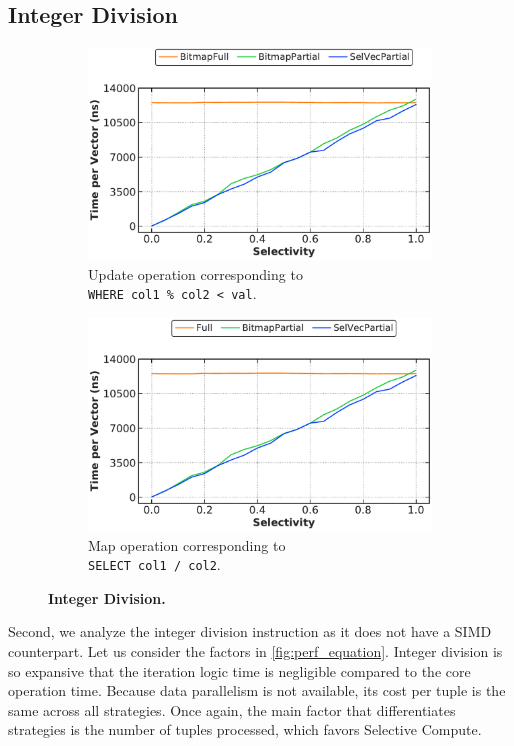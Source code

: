 \documentclass[12pt]{cmuthesis}
\begin{document}
\subsection{Integer Division}
\begin{figure}[t!]
\captionsetup[subfigure]{justification=justified}
\centering
\begin{subfigure}[t]{.49\linewidth}
 \centering
 \includegraphics[width=0.9\linewidth]{eval/simple_division_update.pdf}
 \caption{Update operation corresponding to \\ \texttt{\footnotesize WHERE col1 \% col2 < val}.}
  \label{fig:division_update}
\end{subfigure}
\begin{subfigure}[t]{.49\linewidth}
 \centering
 \includegraphics[width=0.9\linewidth]{eval/simple_division_map.pdf}
 \caption{Map operation corresponding to \\ \texttt{\footnotesize SELECT col1 / col2}.}
  \label{fig:division_map}
\end{subfigure}
\caption{\textbf{Integer Division.}}
\label{fig:division_map_update}
\end{figure}
Second, we analyze the integer division instruction as it does not have a SIMD counterpart. Let us consider the factors in \cref{fig:perf_equation}. Integer division is so expansive that the iteration logic time is negligible compared to the core operation time. Because data parallelism is not available, its cost per tuple is the same across all strategies. Once again, the main factor that differentiates strategies is the number of tuples processed, which favors Selective Compute.
\end{document}
